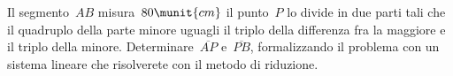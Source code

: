 \begin{esercizio}
 \label{ese:22.23}
Il segmento~\(AB\) misura~\(80\munit{cm}\) il punto~\(P\) lo divide in due 
parti tali 
che il quadruplo della parte minore uguagli il triplo della differenza fra 
la maggiore e il triplo della minore. 
Determinare~\(\overline{AP}\) e~\(\overline{PB}\), formalizzando
il problema con un sistema lineare che risolverete con il metodo di
riduzione.
\begin{center}
%  
\end{center}
\end{esercizio}

% 
% 
